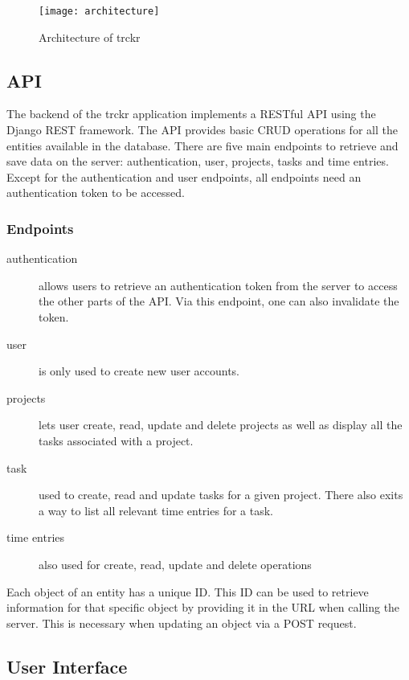 \documentclass[bibliography=totoc, listof=totocnumbered]{scrartcl}
\begin{document}
\begin{figure}[h]
    \texttt{[image: architecture]}
    \caption{Architecture of trckr}
    \label{fig:architecture}
\end{figure}

\subsection{API}
The backend of the trckr application implements a RESTful API using the Django
REST framework. The API provides basic CRUD operations for all the entities
available in the database. There are five main endpoints to retrieve and save
data on the server: authentication, user, projects, tasks and time entries. Except
for the authentication and user endpoints, all endpoints need an authentication
token to be accessed.

\subsubsection{Endpoints}
\begin{description}
\item[authentication] allows users to retrieve an authentication token from the
  server to access the other parts of the API. Via this endpoint, one can also
  invalidate the token.
\item[user] is only used to create new user accounts.
\item[projects] lets user create, read, update and delete projects as well as
  display all the tasks associated with a project.
\item[task] used to create, read and update tasks for a given project. There
  also exits a way to list all relevant time entries for a task.
\item[time entries] also used for create, read, update and delete operations
\end{description}

Each object of an entity has a unique ID. This ID can be used to retrieve
information for that specific object by providing it in the URL when calling the
server. This is necessary when updating an object via a POST request.

\subsection{User Interface}
\end{document}

